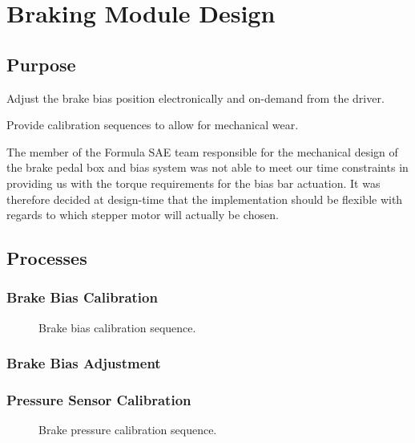 \section{Braking Module Design\label{sec:Braking-Module-Design}}


\subsection{Purpose}

Adjust the brake bias position electronically and on-demand from the driver.

Provide calibration sequences to allow for mechanical wear.

The member of the Formula SAE team responsible for the mechanical design of the brake pedal box and bias system was not able to meet our time constraints in providing us with the torque requirements for the bias bar actuation. It was therefore decided at design-time that the implementation should be flexible with regards to which stepper motor will actually be chosen.


\subsection{Processes}


\subsubsection{Brake Bias Calibration}

\begin{figure}
\centering

\caption{Brake bias calibration sequence.}
\label{fig:pneumatics_design}
\end{figure}

\subsubsection{Brake Bias Adjustment}


\subsubsection{Pressure Sensor Calibration}

\begin{figure}
\centering

\caption{Brake pressure calibration sequence.}
\label{fig:pneumatics_design}
\end{figure}


